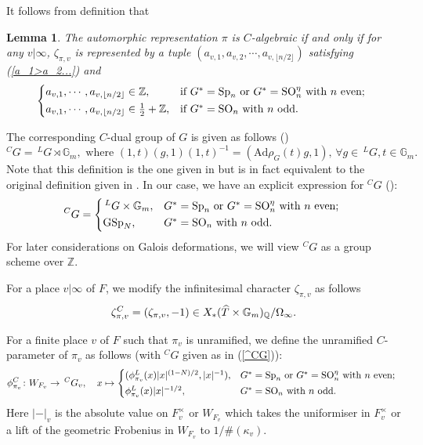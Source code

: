 \documentclass[12pt,oneside,reqno]{amsart}
\newcommand{\G}{\mathbb{G}}
\newcommand{\Q}{\mathbb{Q}}
\newcommand{\Z}{\mathbb{Z}}
\theoremstyle{plain}
\newtheorem{lemma}[theorem]{Lemma}
\begin{document}
    
    
	It follows from definition that
	\begin{lemma}\label{criterion for C-algebraic}
		The automorphic representation $\pi$ is $C$-algebraic if and only if for any $v|\infty$, $\zeta_{\pi,v}$ is represented by a tuple $(a_{v,1},a_{v,2},\cdots,a_{v,\lfloor n/2\rfloor})$ satisfying (\ref{a_1>a_2...}) and
		\[
		\begin{cases*}
			a_{v,1},\cdots,a_{v,\lfloor n/2\rfloor}\in\Z,
			&
			if $G^\ast=\mathrm{Sp}_n$ or $G^\ast=\mathrm{SO}_n^\eta$ with $n$ even;
			\\
			a_{v,1},\cdots,a_{v,\lfloor n/2\rfloor}\in\frac{1}{2}+\Z,
			&
			 if $G^\ast=\mathrm{SO}_n$ with $n$ odd.
		\end{cases*}
		\]
	\end{lemma}
	
	
	
	
	
	
	The corresponding $C$-dual group of $G$ is given as follows (\cite[§3.1]{Shin2024})
	\[
	^CG=\,^LG\rtimes\G_m,
	\text{ where }
	(1,t)(g,1)(1,t)^{-1}=(\mathrm{Ad}\rho_G(t)g,1),
	\,
	\forall
	g\in\,^LG,t\in\G_m.
	\]
	Note that this definition is the one given in \cite{Zhu2021} but is in fact equivalent to the original definition given in \cite{BuzzardGee2014}. In our case, we have an explicit expression for $^CG$ (\cite[Examples 3.1.6 and 3.1.7]{Shin2024}):
	\begin{equation}\label{^CG}
		^CG
		=
		\begin{cases*}
			\,^LG\times\G_m,
			&
			$G^\ast=\mathrm{Sp}_n$ or $G^\ast=\mathrm{SO}_n^\eta$ with $n$ even;
			\\
			\mathrm{GSp}_N,
			&
			$G^\ast=\mathrm{SO}_n$ with $n$ odd.
		\end{cases*}
	\end{equation}
	For later considerations on Galois deformations, we will view $^CG$ as a group scheme over $\mathbb{Z}$.
	
	
	
	
	
	For a place $v|\infty$ of $F$, we modify the infinitesimal character $\zeta_{\pi,v}$ as follows
	\begin{equation}\label{zeta_{pi,v}^C}
		\zeta_{\pi,v}^C
		=
		(\zeta_{\pi,v},-1)
		\in
		X_\ast(\widehat{T}\times\G_m)_\Q/\Omega_\infty.
	\end{equation}
	
	
	
	
	For a finite place $v$ of $F$ such that $\pi_v$ is unramified, we define the unramified $C$-parameter of $\pi_v$ as follows (with $^CG$ given as in (\ref{^CG})):
	\[
	\phi_{\pi_v}^C
	\colon
	W_{F_v}\to\,^CG_v,
	\quad
	x
	\mapsto
	\begin{cases*}
		(\phi_{\pi_v}^L(x)|x|^{(1-N)/2},|x|^{-1}),
		&
		$G^\ast=\mathrm{Sp}_n$ or $G^\ast=\mathrm{SO}_n^\eta$ with $n$ even;
		\\
		\phi_{\pi_v}^L(x)|x|^{-1/2},
		&
		$G^\ast=\mathrm{SO}_n$ with $n$ odd.
	\end{cases*}
	\]
	Here $|-|_v$ is the absolute value on $F_v^\times$ or $W_{F_v}$ which takes the uniformiser in $F_v^\times$ or a lift of the geometric Frobenius in $W_{F_v}$ to $1/\# (\kappa_v)$.
	
\end{document}
